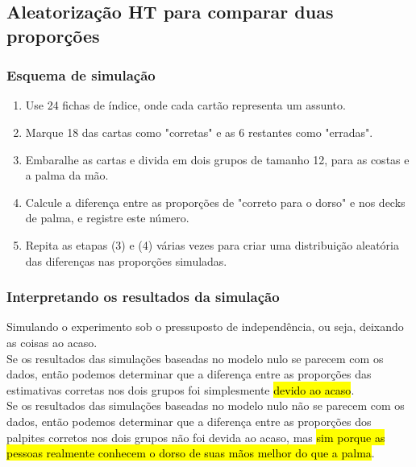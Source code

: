 
\subsection{Aleatorização HT para comparar duas proporções}


\begin{frame}
\frametitle{Esquema de simulação}

\begin{enumerate}
\justifying
\item Use 24 fichas de índice, onde cada cartão representa um assunto.
\justifying
\item Marque 18 das cartas como "corretas" e as 6 restantes como "erradas".
\justifying
\item Embaralhe as cartas e divida em dois grupos de tamanho 12, para as costas e a palma da mão.
\justifying
\item Calcule a diferença entre as proporções de "correto para o dorso" e nos decks de palma, e registre este número.
\justifying
\item Repita as etapas (3) e (4) várias vezes para criar uma distribuição aleatória das diferenças nas proporções simuladas.

\end{enumerate}

\end{frame}


\begin{frame}
\frametitle{Interpretando os resultados da simulação}
\justifying
Simulando o experimento sob o pressuposto de independência, ou seja, deixando as coisas ao acaso. \\

\vspace{0.5cm}
\justifying
Se os resultados das simulações baseadas no modelo nulo se parecem com os dados, então podemos determinar que a diferença entre as proporções das estimativas corretas nos dois grupos foi simplesmente \hl{devido ao acaso}. \\

\vspace{0.5cm}
\justifying
Se os resultados das simulações baseadas no modelo nulo não se parecem com os dados, então podemos determinar que a diferença entre as proporções dos palpites corretos nos dois grupos não foi devida ao acaso, mas \hl{sim porque as pessoas realmente conhecem o dorso de suas mãos melhor do que a palma}.

\end{frame}

